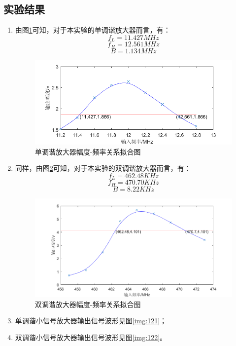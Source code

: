 \documentclass[12pt]{article}%
\numberwithin{equation}{section}
\begin{document}
\subsection{实验结果}
\begin{enumerate}\addtolength{\itemsep}{-1.5ex}
\item 由图\ref{img:c}可知，对于本实验的单调谐放大器而言，有：$$f_L=11.427MHz $$ $$f_H=12.561MHz $$$$B=1.134MHz$$\par
  \begin{figure}[ht]
  \centering
  \includegraphics[width=\textwidth]{gaopin2/untitled1.png} 
  \caption{ 单调谐放大器幅度-频率关系拟合图} 
  \label{img:c} 
\end{figure}
\item 同样，由图\ref{img:cf}可知，对于本实验的双调谐放大器而言，有：$$f_L=462.48KHz $$ $$f_H=470.70KHz $$$$B=8.22KHz$$\par
  \begin{figure}[ht]
  \centering
  \includegraphics[width=\textwidth]{gaopin2/untitled2.png} 
  \caption{ 双调谐放大器幅度-频率关系拟合图} 
  \label{img:cf} 
\end{figure}
\item  单调谐小信号放大器输出信号波形见图\ref{img:121}；
\item 双调谐小信号放大器输出信号波形见图\ref{img:122}。
\begin{figure}[htbp]

\end{figure}
\end{enumerate}
\end{document}
